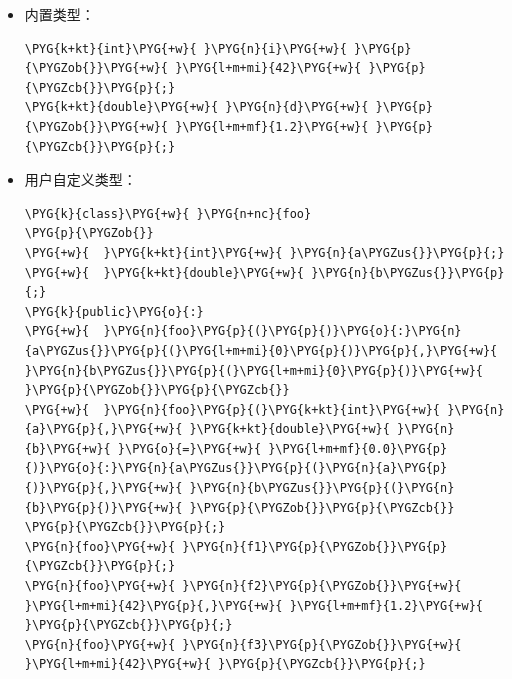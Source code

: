 \begin{itemize}

\item 内置类型：



\begin{codeblockbg}
\begin{Verbatim}[commandchars=\\\{\},breaklines=true,breakanywhere=true,fontsize=\codefont,xleftmargin=17bp]
\PYG{k+kt}{int}\PYG{+w}{ }\PYG{n}{i}\PYG{+w}{ }\PYG{p}{\PYGZob{}}\PYG{+w}{ }\PYG{l+m+mi}{42}\PYG{+w}{ }\PYG{p}{\PYGZcb{}}\PYG{p}{;}
\PYG{k+kt}{double}\PYG{+w}{ }\PYG{n}{d}\PYG{+w}{ }\PYG{p}{\PYGZob{}}\PYG{+w}{ }\PYG{l+m+mf}{1.2}\PYG{+w}{ }\PYG{p}{\PYGZcb{}}\PYG{p}{;}
\end{Verbatim}
\end{codeblockbg}



\item 用户自定义类型：



\begin{codeblockbg}
\begin{Verbatim}[commandchars=\\\{\},breaklines=true,breakanywhere=true,fontsize=\codefont,xleftmargin=17bp]
\PYG{k}{class}\PYG{+w}{ }\PYG{n+nc}{foo}
\PYG{p}{\PYGZob{}}
\PYG{+w}{  }\PYG{k+kt}{int}\PYG{+w}{ }\PYG{n}{a\PYGZus{}}\PYG{p}{;}
\PYG{+w}{  }\PYG{k+kt}{double}\PYG{+w}{ }\PYG{n}{b\PYGZus{}}\PYG{p}{;}
\PYG{k}{public}\PYG{o}{:}
\PYG{+w}{  }\PYG{n}{foo}\PYG{p}{(}\PYG{p}{)}\PYG{o}{:}\PYG{n}{a\PYGZus{}}\PYG{p}{(}\PYG{l+m+mi}{0}\PYG{p}{)}\PYG{p}{,}\PYG{+w}{ }\PYG{n}{b\PYGZus{}}\PYG{p}{(}\PYG{l+m+mi}{0}\PYG{p}{)}\PYG{+w}{ }\PYG{p}{\PYGZob{}}\PYG{p}{\PYGZcb{}}
\PYG{+w}{  }\PYG{n}{foo}\PYG{p}{(}\PYG{k+kt}{int}\PYG{+w}{ }\PYG{n}{a}\PYG{p}{,}\PYG{+w}{ }\PYG{k+kt}{double}\PYG{+w}{ }\PYG{n}{b}\PYG{+w}{ }\PYG{o}{=}\PYG{+w}{ }\PYG{l+m+mf}{0.0}\PYG{p}{)}\PYG{o}{:}\PYG{n}{a\PYGZus{}}\PYG{p}{(}\PYG{n}{a}\PYG{p}{)}\PYG{p}{,}\PYG{+w}{ }\PYG{n}{b\PYGZus{}}\PYG{p}{(}\PYG{n}{b}\PYG{p}{)}\PYG{+w}{ }\PYG{p}{\PYGZob{}}\PYG{p}{\PYGZcb{}}
\PYG{p}{\PYGZcb{}}\PYG{p}{;}
\PYG{n}{foo}\PYG{+w}{ }\PYG{n}{f1}\PYG{p}{\PYGZob{}}\PYG{p}{\PYGZcb{}}\PYG{p}{;}
\PYG{n}{foo}\PYG{+w}{ }\PYG{n}{f2}\PYG{p}{\PYGZob{}}\PYG{+w}{ }\PYG{l+m+mi}{42}\PYG{p}{,}\PYG{+w}{ }\PYG{l+m+mf}{1.2}\PYG{+w}{ }\PYG{p}{\PYGZcb{}}\PYG{p}{;}
\PYG{n}{foo}\PYG{+w}{ }\PYG{n}{f3}\PYG{p}{\PYGZob{}}\PYG{+w}{ }\PYG{l+m+mi}{42}\PYG{+w}{ }\PYG{p}{\PYGZcb{}}\PYG{p}{;}
\end{Verbatim}
\end{codeblockbg}



\end{itemize}
